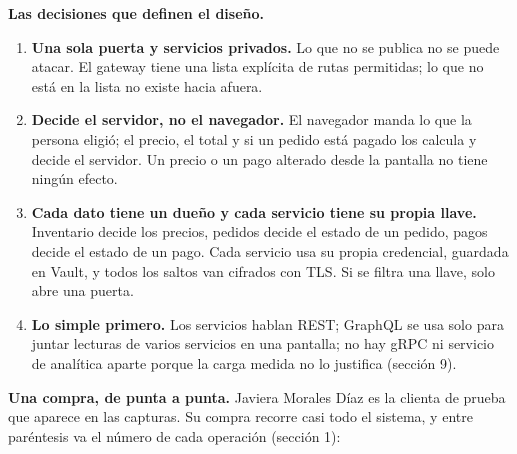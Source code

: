 \textbf{Las decisiones que definen el diseño.}


\begin{enumerate}[nosep,leftmargin=*]
\item \textbf{Una sola puerta y servicios privados.} Lo que no se publica no se puede atacar. El gateway tiene una lista explícita de rutas permitidas; lo que no está en la lista no existe hacia afuera.
\item \textbf{Decide el servidor, no el navegador.} El navegador manda lo que la persona eligió; el precio, el total y si un pedido está pagado los calcula y decide el servidor. Un precio o un pago alterado desde la pantalla no tiene ningún efecto.
\item \textbf{Cada dato tiene un dueño y cada servicio tiene su propia llave.} Inventario decide los precios, pedidos decide el estado de un pedido, pagos decide el estado de un pago. Cada servicio usa su propia credencial, guardada en Vault, y todos los saltos van cifrados con TLS. Si se filtra una llave, solo abre una puerta.
\item \textbf{Lo simple primero.} Los servicios hablan REST; GraphQL se usa solo para juntar lecturas de varios servicios en una pantalla; no hay gRPC ni servicio de analítica aparte porque la carga medida no lo justifica (sección 9).
\end{enumerate}

\textbf{Una compra, de punta a punta.} Javiera Morales Díaz es la clienta de prueba que aparece en las capturas. Su compra recorre casi todo el sistema, y entre paréntesis va el número de cada operación (sección 1):


